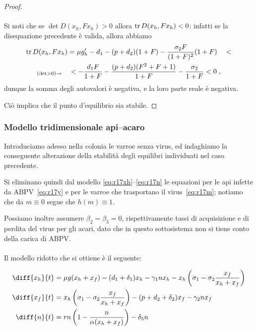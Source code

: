 \begin{proof}
\paragraph{}
Si noti che se $\det D(x_h, F x_h) > 0$ allora $\operatorname{tr} D(x_h, F x_h) <0$: infatti se la disequazione
precedente è valida, allora abbiamo
\begin{multline*}
\operatorname{tr} D(x_h, F x_h) = \mu g_h' -d_1 -(p+d_2)(1+F) - \frac{\sigma_2 F}{(1+F)^2} (1+F)
\quad < \\
 _{(\det >0) \rightarrow} \quad
< - \frac{d_1 F}{1+F} - \frac{(p +d_2) (F^2 +F+1)}{1+F} - \frac{\sigma_2}{1+F} < 0 \; ,
\end{multline*}
dunque la somma degli autovalori è negativa, e la loro parte reale è negativa.

Ciò implica che il punto d'equilibrio sia stabile.
\end{proof}


\subsubsection{Modello tridimensionale api--acaro}
Introduciamo adesso nella colonia le varroe senza virus, ed indaghiamo la conseguente alterazione della stabilità degli equilibri individuati nel caso precedente.

Si eliminano quindi dal modello \eqref{eq:r17xh}--\eqref{eq:r17n} le equazioni per le api infette
da ABPV~\eqref{eq:r17y} e per le varroe che trasportano il virus~\eqref{eq:r17m};
notiamo che da $m \equiv 0$ segue che $h(m) \equiv 1$.

Possiamo inoltre assumere $\beta_2 = \beta_3 = 0$, rispettivamente tassi di acquisizione e di perdita
del virus per gli acari, dato che in questo sottosistema non si tiene conto della carica di ABPV.

\paragraph{}
Il modello ridotto che si ottiene è il seguente:

\begin{align}
    \diff{x_h}{t} &= \mu g( x_h + x_f ) - (d_1 + \delta_1) x_h - \gamma_1 n x_h
        - x_h \left( \sigma_1 - \sigma_2 \frac{x_f}{x_h + x_f} \right)
        \label{eq:rattiRidotto2prima}
    \\
    \diff{x_f}{t} &= x_h \left( \sigma_1 - \sigma_2 \frac{x_f}{x_h + x_f} \right) - (p + d_2 + \delta_2) x_f
        - \gamma_2 n x_f
        \label{eq:rattiRidotto2seconda}
    \\
    \diff{n}{t} &= rn \left( 1 - \frac{n}{ \alpha (x_h + x_f) } \right) - \delta_5 n
        \label{eq:rattiRidotto2terza}
\end{align}

